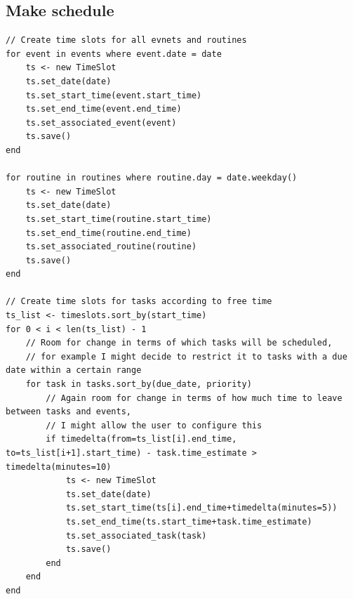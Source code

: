 \documentclass{article}
\begin{document}
\subsection{Make schedule}
\begin{lstlisting}[breaklines]
// Create time slots for all evnets and routines
for event in events where event.date = date
    ts <- new TimeSlot
    ts.set_date(date)
    ts.set_start_time(event.start_time)
    ts.set_end_time(event.end_time)
    ts.set_associated_event(event)
    ts.save()
end

for routine in routines where routine.day = date.weekday()
    ts <- new TimeSlot
    ts.set_date(date)
    ts.set_start_time(routine.start_time)
    ts.set_end_time(routine.end_time)
    ts.set_associated_routine(routine)
    ts.save()
end

// Create time slots for tasks according to free time
ts_list <- timeslots.sort_by(start_time)
for 0 < i < len(ts_list) - 1
    // Room for change in terms of which tasks will be scheduled,
    // for example I might decide to restrict it to tasks with a due date within a certain range
    for task in tasks.sort_by(due_date, priority)
        // Again room for change in terms of how much time to leave between tasks and events,
        // I might allow the user to configure this
        if timedelta(from=ts_list[i].end_time, to=ts_list[i+1].start_time) - task.time_estimate > timedelta(minutes=10)
            ts <- new TimeSlot
            ts.set_date(date)
            ts.set_start_time(ts[i].end_time+timedelta(minutes=5))
            ts.set_end_time(ts.start_time+task.time_estimate)
            ts.set_associated_task(task)
            ts.save()
        end
    end
end
\end{lstlisting}
\end{document}
